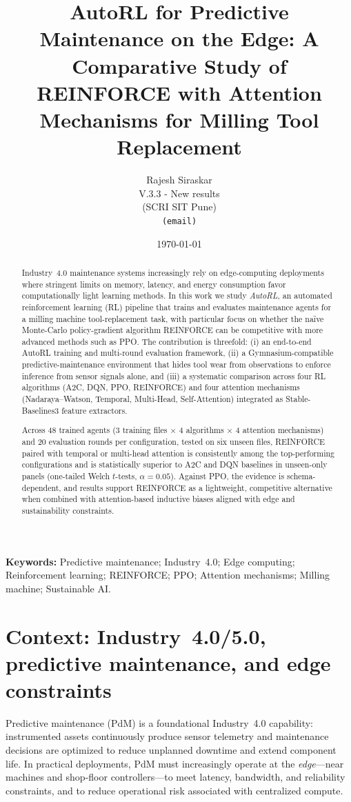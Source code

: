 \documentclass[11pt]{article}
\title{AutoRL for Predictive Maintenance on the Edge: \texorpdfstring{\newline}{ }A Comparative Study of REINFORCE with Attention Mechanisms for Milling Tool Replacement}
\author{Rajesh Siraskar\\
\small V.3.3 - New results\\
\small (SCRI SIT Pune)\\
\small \texttt{(email)}
}
\date{\today}
\begin{document}
\maketitle

\begin{abstract}
Industry~4.0 maintenance systems increasingly rely on edge-computing deployments where stringent limits on memory, latency, and energy consumption favor computationally light learning methods. In this work we study \emph{AutoRL}, an automated reinforcement learning (RL) pipeline that trains and evaluates maintenance agents for a milling machine tool-replacement task, with particular focus on whether the na\"{i}ve Monte-Carlo policy-gradient algorithm \textsc{REINFORCE} can be competitive with more advanced methods such as \textsc{PPO}. The contribution is threefold: (i) an end-to-end AutoRL training and multi-round evaluation framework, (ii) a Gymnasium-compatible predictive-maintenance environment that hides tool wear from observations to enforce inference from sensor signals alone, and (iii) a systematic comparison across four RL algorithms (\textsc{A2C}, \textsc{DQN}, \textsc{PPO}, \textsc{REINFORCE}) and four attention mechanisms (Nadaraya--Watson, Temporal, Multi-Head, Self-Attention) integrated as Stable-Baselines3 feature extractors.

Across 48 trained agents (3 training files $\times$ 4 algorithms $\times$ 4 attention mechanisms) and 20 evaluation rounds per configuration, tested on six unseen files, \textsc{REINFORCE} paired with temporal or multi-head attention is consistently among the top-performing configurations and is statistically superior to A2C and DQN baselines in unseen-only panels (one-tailed Welch $t$-tests, $\alpha=0.05$). Against PPO, the evidence is schema-dependent, and results support \textsc{REINFORCE} as a lightweight, competitive alternative when combined with attention-based inductive biases aligned with edge and sustainability constraints.
\end{abstract}

\textbf{Keywords:} Predictive maintenance; Industry~4.0; Edge computing; Reinforcement learning; \textsc{REINFORCE}; \textsc{PPO}; Attention mechanisms; Milling machine; Sustainable AI.

\section{Context: Industry~4.0/5.0, predictive maintenance, and edge constraints}
Predictive maintenance (PdM) is a foundational Industry~4.0 capability: instrumented assets continuously produce sensor telemetry and maintenance decisions are optimized to reduce unplanned downtime and extend component life. In practical deployments, PdM must increasingly operate at the \emph{edge}---near machines and shop-floor controllers---to meet latency, bandwidth, and reliability constraints, and to reduce operational risk associated with centralized compute.
\end{document}
